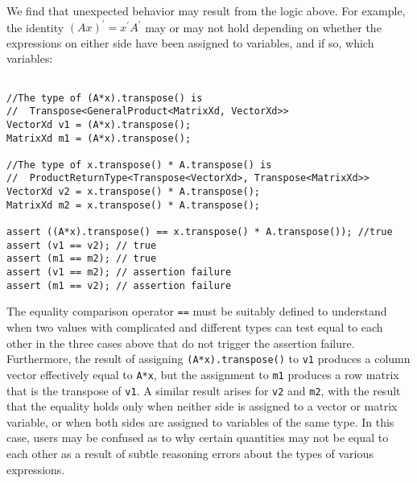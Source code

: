 We find that unexpected behavior may result from the logic above. For example, the identity $(Ax)^\prime = x^\prime A^\prime$ may or may not hold depending on whether the expressions on either side have been assigned to variables, and if so, which variables:
%
\begin{verbatim}

//The type of (A*x).transpose() is
//  Transpose<GeneralProduct<MatrixXd, VectorXd>>
VectorXd v1 = (A*x).transpose();
MatrixXd m1 = (A*x).transpose();

//The type of x.transpose() * A.transpose() is
//  ProductReturnType<Transpose<VectorXd>, Transpose<MatrixXd>>
VectorXd v2 = x.transpose() * A.transpose();
MatrixXd m2 = x.transpose() * A.transpose();

assert ((A*x).transpose() == x.transpose() * A.transpose()); //true
assert (v1 == v2); // true
assert (m1 == m2); // true
assert (v1 == m2); // assertion failure
assert (m1 == v2); // assertion failure

\end{verbatim}
%
The equality comparison operator \verb|==| must be suitably defined to understand when two values with complicated and different types can test equal to each other in the three cases above that do not trigger the assertion failure. Furthermore, the result of assigning \verb|(A*x).transpose()| to  \verb|v1| produces a column vector effectively equal to \verb|A*x|,
but the assignment to \verb|m1| produces a row matrix that is the transpose of \verb|v1|.
A similar result arises for \verb|v2| and \verb|m2|, with the result that the equality holds only when neither side is assigned to a vector or matrix variable, or when both sides are assigned to variables of the same type. In this case, users may be confused as to why certain quantities may not be equal to each other as a result of subtle reasoning errors about the types of various expressions.
